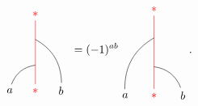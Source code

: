 \begin{enumerate}
			\begin{equation*}
				\begin{tikzpicture}[scale=0.8,baseline=(current bounding box.center)]
				\node[red](m) at (0,0) {$*$};
				\node(a) at (-1,0) {$a$};
				\node(b) at (1,0) {$b$};
				\node[red](abm) at (0,3) {$*$};
				\draw[red] (m) -- (abm);
				\draw (a) to [bend left] (0,1);
				\draw (b) to [bend right] (0,2);
				\end{tikzpicture}\ =(-1)^{ab}
				\begin{tikzpicture}[scale=0.9,baseline=(current bounding box.center)]
				\node[red](m) at (0,0) {$*$};
				\node(a) at (-1,0) {$a$};
				\node(b) at (1,0) {$b$};
				\node[red](abm) at (0,3) {$*$};
				\draw[red] (m) -- (abm);
				\draw (b) to [bend right] (0,1);
				\draw (a) to [bend left] (0,2);
				\end{tikzpicture}.
			\end{equation*}
	\end{enumerate}

